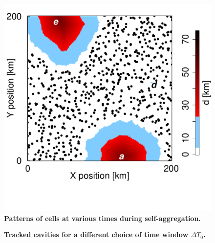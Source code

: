 \documentclass[reprint,amsmath,amssymb]{revtex4-1}
\begin{document}
\begin{figure}
\includegraphics[trim={0 0 1.8cm 0},clip,height=0.32\linewidth]{distance_27.pdf}
\caption{{\bf Patterns of cells at various times during self-aggregation.}}
\label{fig:cavities_supp}
\end{figure}


\begin{figure}
\centering
\caption{{\bf Tracked cavities for a different choice of time window $\Delta T_0$.}}
\label{fig:cavities_track_supp}
\end{figure}
\end{document}
